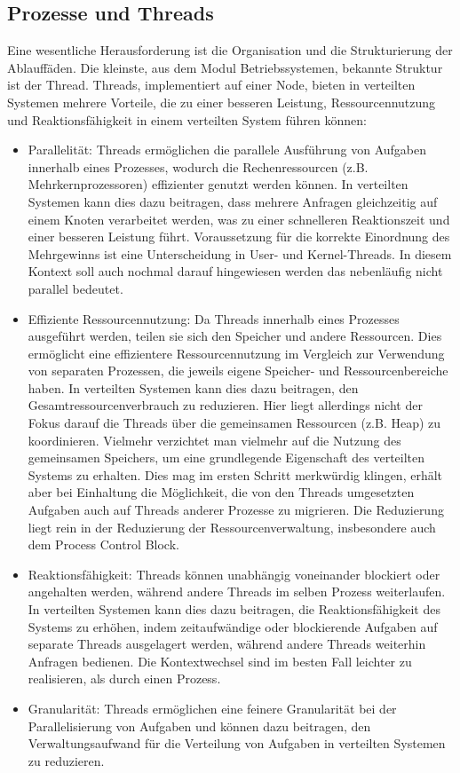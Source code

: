 \documentclass[../vs-script-first-v01.tex]{subfiles}
\begin{document}
\subsection{Prozesse und Threads}
Eine wesentliche Herausforderung ist die Organisation und die Strukturierung der Ablauffäden. Die kleinste, aus dem Modul Betriebssystemen, bekannte Struktur ist der Thread. Threads, implementiert auf einer Node, bieten in verteilten Systemen mehrere Vorteile, die zu einer besseren Leistung, Ressourcennutzung und Reaktionsfähigkeit in einem verteilten System führen können:
\begin{itemize}
\item Parallelität: Threads ermöglichen die parallele Ausführung von Aufgaben innerhalb eines Prozesses, wodurch die Rechenressourcen (z.B. Mehrkernprozessoren) effizienter genutzt werden können. In verteilten Systemen kann dies dazu beitragen, dass mehrere Anfragen gleichzeitig auf einem Knoten verarbeitet werden, was zu einer schnelleren Reaktionszeit und einer besseren Leistung führt. Voraussetzung für die korrekte Einordnung des Mehrgewinns ist eine Unterscheidung in User- und Kernel-Threads. In diesem Kontext soll auch nochmal darauf hingewiesen werden das nebenläufig nicht parallel bedeutet. 
\item Effiziente Ressourcennutzung: Da Threads innerhalb eines Prozesses ausgeführt werden, teilen sie sich den Speicher und andere Ressourcen. Dies ermöglicht eine effizientere Ressourcennutzung im Vergleich zur Verwendung von separaten Prozessen, die jeweils eigene Speicher- und Ressourcenbereiche haben. In verteilten Systemen kann dies dazu beitragen, den Gesamtressourcenverbrauch zu reduzieren. Hier liegt allerdings nicht der Fokus darauf die Threads über die gemeinsamen Ressourcen (z.B. Heap) zu koordinieren. Vielmehr verzichtet man vielmehr auf die Nutzung des gemeinsamen Speichers, um eine grundlegende Eigenschaft des verteilten Systems zu erhalten. Dies mag  im ersten Schritt merkwürdig klingen, erhält aber bei Einhaltung die Möglichkeit, die von den Threads umgesetzten Aufgaben auch auf Threads anderer Prozesse zu migrieren. Die Reduzierung liegt rein in der Reduzierung der Ressourcenverwaltung, insbesondere auch dem Process Control Block.  

\item Reaktionsfähigkeit: Threads können unabhängig voneinander blockiert oder angehalten werden, während andere Threads im selben Prozess weiterlaufen. In verteilten Systemen kann dies dazu beitragen, die Reaktionsfähigkeit des Systems zu erhöhen, indem zeitaufwändige oder blockierende Aufgaben auf separate Threads ausgelagert werden, während andere Threads weiterhin Anfragen bedienen. Die Kontextwechsel sind im besten Fall leichter zu realisieren, als durch einen Prozess.

\item Granularität: Threads ermöglichen eine feinere Granularität bei der Parallelisierung von Aufgaben und können dazu beitragen, den Verwaltungsaufwand für die Verteilung von Aufgaben in verteilten Systemen zu reduzieren.
\end{itemize}
\end{document}
